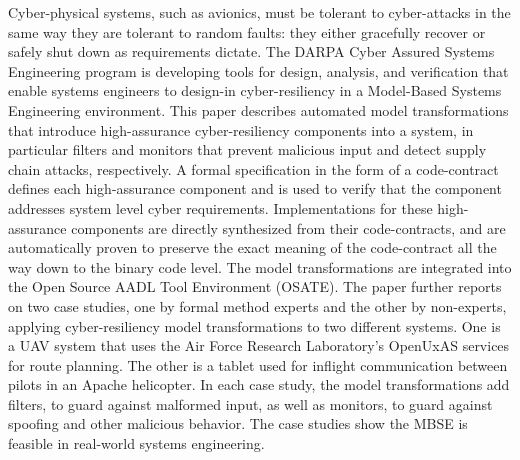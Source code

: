 Cyber-physical systems, such as avionics, must be tolerant to
cyber-attacks in the same way they are tolerant to random faults: they
either gracefully recover or safely shut down as requirements dictate.
The DARPA Cyber Assured Systems Engineering program is developing
tools for design, analysis, and verification that enable systems
engineers to design-in cyber-resiliency in a Model-Based Systems
Engineering environment.  This paper describes automated model
transformations that introduce high-assurance cyber-resiliency
components into a system, in particular filters and monitors that
prevent malicious input and detect supply chain attacks, respectively.
A formal specification in the form of a code-contract defines each high-assurance component and is
used to verify that the component addresses system level cyber
requirements.  Implementations for these high-assurance components are
directly synthesized from their code-contracts, and are automatically
proven to preserve the exact meaning of the code-contract all the way
down to the binary code level.  The model transformations are
integrated into the Open Source AADL Tool Environment (OSATE).  The
paper further reports on two case studies, one by formal method experts 
and the other by non-experts,
applying cyber-resiliency model
transformations to two different systems. 
One is a UAV system that uses the Air Force Research
Laboratory's OpenUxAS services for route planning.
The other is a tablet used for inflight communication between pilots in an Apache helicopter.
In each case study, the model transformations add filters, to guard against malformed
input, as well as monitors, to guard against spoofing and other malicious behavior.
The case studies show the MBSE is feasible in real-world systems engineering.